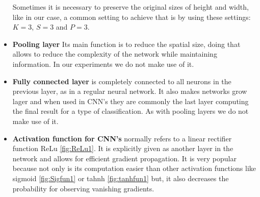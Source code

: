 \begin{itemize}
Sometimes it is necessary to preserve the original sizes of height and width, like in our case, a common setting to achieve that is by using these settings: $K =3$, $S =3$ and $P =3$.   

\item \textbf{Pooling layer} Its main function is to reduce the spatial size, doing that allows to reduce the complexity of the network while maintaining information. In our experiments we do not make use of it. \

\item \textbf{Fully connected layer} is completely connected to all neurons in the previous layer, as in a regular neural network. It also makes networks grow lager and when used in CNN's they are commonly the last layer computing the final result for a type of classification. As with pooling layers we do not make use of it. 

\item \textbf{Activation function for CNN's} normally refers to a linear rectifier function ReLu \ref{fig:ReLu1}. It is explicitly given as another layer in the network and allows for efficient gradient propagation. It is very popular because not only is its computation easier than other activation functions like sigmoid \ref{fig:Sigfun1} or tahnh \ref{fig:tanhfun1} but, it also decreases the probability for observing vanishing gradients.

\end{itemize}

